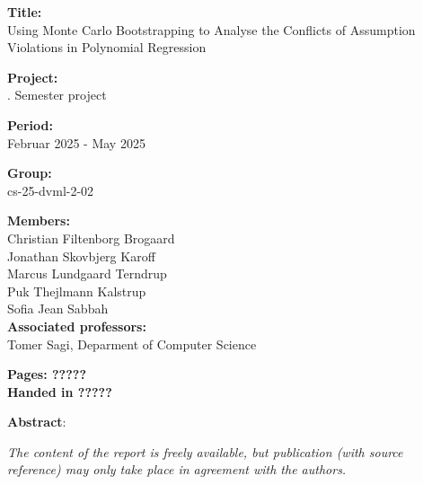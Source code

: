 \begin{minipage}[t]{0.48\textwidth}
\textbf{Title:} \\[5pt]
\noindent Using Monte Carlo Bootstrapping to Analyse the Conflicts of Assumption Violations in Polynomial Regression

\vspace*{2ex}

\textbf{Project:} \\[5pt]. Semester project

\textbf{Period:} \\[5pt]\bigskip
Februar 2025 -  May 2025

\textbf{Group:} \\[5pt]\bigskip
cs-25-dvml-2-02

\textbf{Members:} \\[5pt]
Christian Filtenborg Brogaard \\
Jonathan Skovbjerg Karoff \\
Marcus Lundgaard Terndrup \\
Puk Thejlmann Kalstrup \\
Sofia Jean Sabbah \\


\textbf{Associated professors:} \\[5pt]
Tomer Sagi, Deparment of Computer Science
\\\hspace*{2ex}

\vspace*{1cm}

\textbf{Pages: ?????} \\
\textbf{Handed in ?????}

\end{minipage}
\hfill
\begin{minipage}[t]{0.5\textwidth}
\textbf{Abstract}: \\[5pt]
\fbox{\parbox{8cm}{}}
\end{minipage}

\vfill

{\footnotesize\itshape \noindent The content of the report is freely available, but publication (with source reference) may only take place in agreement with the authors.}


